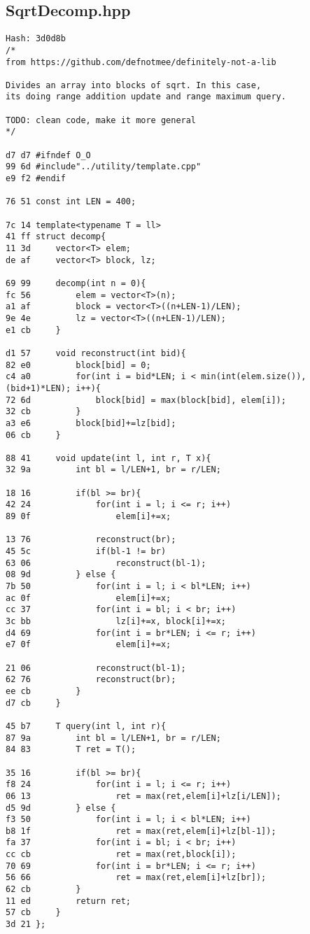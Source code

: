 \documentclass[11pt, a4paper, twoside]{article}
\begin{document}
\subsection{SqrtDecomp.hpp}
\begin{lstlisting}
Hash: 3d0d8b
/*
from https://github.com/defnotmee/definitely-not-a-lib

Divides an array into blocks of sqrt. In this case,
its doing range addition update and range maximum query.

TODO: clean code, make it more general
*/

d7 d7 #ifndef O_O
99 6d #include"../utility/template.cpp"
e9 f2 #endif

76 51 const int LEN = 400;

7c 14 template<typename T = ll>
41 ff struct decomp{
11 3d     vector<T> elem;
de af     vector<T> block, lz;
      
69 99     decomp(int n = 0){
fc 56         elem = vector<T>(n);
a1 af         block = vector<T>((n+LEN-1)/LEN);
9e 4e         lz = vector<T>((n+LEN-1)/LEN);
e1 cb     }
      
d1 57     void reconstruct(int bid){
82 e0         block[bid] = 0;
c4 a0         for(int i = bid*LEN; i < min(int(elem.size()), (bid+1)*LEN); i++){
72 6d             block[bid] = max(block[bid], elem[i]);
32 cb         }
a3 e6         block[bid]+=lz[bid];
06 cb     }
      
88 41     void update(int l, int r, T x){
32 9a         int bl = l/LEN+1, br = r/LEN;
      
18 16         if(bl >= br){
42 24             for(int i = l; i <= r; i++)
89 0f                 elem[i]+=x;
      
13 76             reconstruct(br);
45 5c             if(bl-1 != br)
63 06                 reconstruct(bl-1);
08 9d         } else {
7b 50             for(int i = l; i < bl*LEN; i++)
ac 0f                 elem[i]+=x;
cc 37             for(int i = bl; i < br; i++)
3c bb                 lz[i]+=x, block[i]+=x;
d4 69             for(int i = br*LEN; i <= r; i++)
e7 0f                 elem[i]+=x;
      
21 06             reconstruct(bl-1);
62 76             reconstruct(br);
ee cb         }
d7 cb     }
      
45 b7     T query(int l, int r){
87 9a         int bl = l/LEN+1, br = r/LEN;
84 83         T ret = T();
      
35 16         if(bl >= br){
f8 24             for(int i = l; i <= r; i++)
06 13                 ret = max(ret,elem[i]+lz[i/LEN]);
d5 9d         } else {
f3 50             for(int i = l; i < bl*LEN; i++)
b8 1f                 ret = max(ret,elem[i]+lz[bl-1]);
fa 37             for(int i = bl; i < br; i++)
cc cb                 ret = max(ret,block[i]);
70 69             for(int i = br*LEN; i <= r; i++)
56 66                 ret = max(ret,elem[i]+lz[br]);
62 cb         }
11 ed         return ret;
57 cb     }
3d 21 };
\end{lstlisting}
\end{document}
